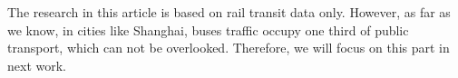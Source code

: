 \documentclass[journal]{IEEEtran}
\begin{document}
The research in this article is based on rail transit data only. However, as far as we know, in cities like Shanghai, buses traffic occupy one third of public transport, which can not be overlooked. Therefore, we will focus on this part in next work.


 





%
%

\end{document}
